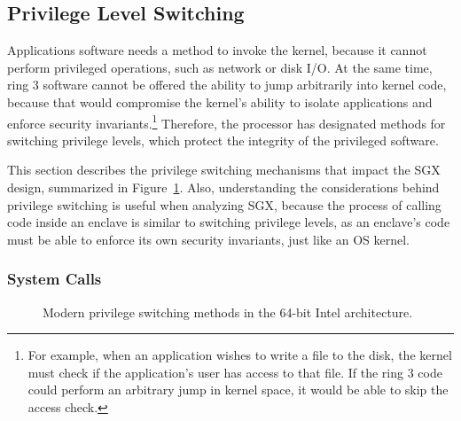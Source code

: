 \subsection{Privilege Level Switching}
\label{sec:privilege_switches}

Applications software needs a method to invoke the kernel, because it cannot
perform privileged operations, such as network or disk I/O. At the same time,
ring 3 software cannot be offered the ability to jump arbitrarily into kernel
code, because that would compromise the kernel's ability to isolate
applications and enforce security invariants.\footnote{For example, when an
application wishes to write a file to the disk, the kernel must check if the
application's user has access to that file. If the ring 3 code could perform an
arbitrary jump in kernel space, it would be able to skip the access check.}
Therefore, the processor has designated methods for switching privilege levels,
which protect the integrity of the privileged software.

This section describes the privilege switching mechanisms that impact the SGX
design, summarized in Figure~\ref{fig:cpu_ring_switch}. Also, understanding the
considerations behind privilege switching is useful when analyzing SGX, because
the process of calling code inside an enclave is similar to switching privilege
levels, as an enclave's code must be able to enforce its own security
invariants, just like an OS kernel.


\subsubsection{System Calls}
\label{sec:syscalls}


\begin{figure}[hbt]
  \caption{
    Modern privilege switching methods in the 64-bit Intel architecture.
  }
  \label{fig:cpu_ring_switch}
\end{figure}

